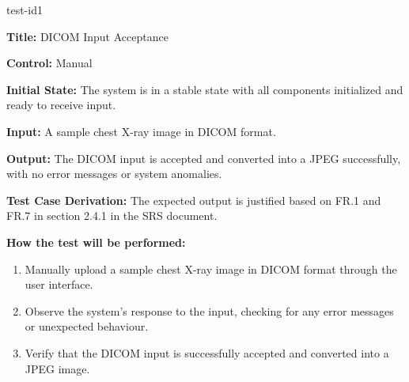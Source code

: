 \documentclass[12pt, titlepage]{article}
\begin{document}
\begin{itemize}
    \begin{item}
        test-id1
        \begin{mdframed}[linewidth=0.5mm]
            \textbf{Title:} DICOM Input Acceptance \par
            \textbf{Control:} Manual \par
            \textbf{Initial State:} The system is in a stable state with all components initialized and ready to receive input. \par
            \textbf{Input:} A sample chest X-ray image in DICOM format. \par
            \textbf{Output:} The DICOM input is accepted and converted into a JPEG successfully, with no error messages or system anomalies. \par
            \textbf{Test Case Derivation:} The expected output is justified based on FR.1 and FR.7 in section 2.4.1 in the SRS document. \par
            \textbf{How the test will be performed:}
            \begin{enumerate}[noitemsep]
                \item Manually upload a sample chest X-ray image in DICOM format through the user interface.
                \item Observe the system's response to the input, checking for any error messages or unexpected behaviour.
                \item Verify that the DICOM input is successfully accepted and converted into a JPEG image.
            \end{enumerate}
        \end{mdframed}
    \end{item}


\end{itemize}
\end{document}

